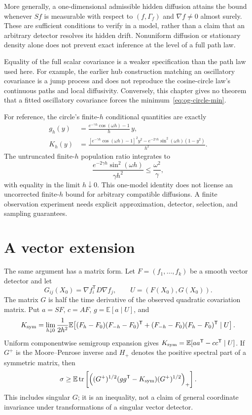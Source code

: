 More generally, a one-dimensional admissible hidden diffusion attains the
bound whenever $Sf$ is measurable with respect to $(f,\Gamma_f)$ and
$\nabla f\ne0$ almost surely. These are sufficient conditions to verify
in a model, rather than a claim that an arbitrary detector resolves its
hidden drift. Nonuniform diffusion or stationary density alone does not
prevent exact inference at the level of a full path law.

Equality of the full scalar covariance is a weaker specification than the
path law used here. For example, the earlier hub construction matching an
oscillatory covariance is a jump process and does not reproduce the
cosine-circle law's continuous paths and local diffusivity. Conversely, this
chapter gives no theorem that a fitted oscillatory covariance forces the
minimum~\eqref{eq:og-circle-min}.

For reference, the circle's finite-$h$ conditional quantities are exactly
\begin{align}
 g_h(y)&=\frac{e^{-\gamma h}\cos(\omega h)-1}{h}\,y,\\
 K_h(y)&=\frac{
 [e^{-\gamma h}\cos(\omega h)-1]^2y^2
 -e^{-2\gamma h}\sin^2(\omega h)(1-y^2)}{h^2}.
 \label{eq:og-circle-finite}
\end{align}
The untruncated finite-$h$ population ratio integrates to
\[
 \frac{e^{-2\gamma h}\sin^2(\omega h)}{\gamma h^2}
 \leq\frac{\omega^2}{\gamma},
\]
with equality in the limit $h\downarrow0$. This one-model identity does not
license an uncorrected finite-$h$ bound for arbitrary compatible diffusions.
A finite observation experiment needs explicit approximation, detector,
selection, and sampling guarantees.

\section{A vector extension}

The same argument has a matrix form. Let $F=(f_1,\ldots,f_k)$ be a smooth
vector detector and let
\[
 G_{ij}(X_0)=\nabla f_i^{\mathsf T}D\nabla f_j,
 \qquad U=(F(X_0),G(X_0)).
\]
The matrix $G$ is half the time derivative of the observed quadratic
covariation matrix. Put $a=SF$, $c=AF$, $g=\mathbb E[a\mid U]$, and
\[
 K_{\rm sym}
 =\lim_{h\downarrow0}\frac{1}{2h^2}\mathbb E\!\left[
 (F_h-F_0)(F_{-h}-F_0)^{\mathsf T}
 +(F_{-h}-F_0)(F_h-F_0)^{\mathsf T}\mid U\right].
\]
Uniform componentwise semigroup expansion gives
$K_{\rm sym}=\mathbb E[aa^{\mathsf T}-cc^{\mathsf T}\mid U]$.
If $G^+$ is the Moore--Penrose inverse and $H_+$ denotes the positive
spectral part of a symmetric matrix, then
\begin{equation}
 \sigma\geq
 \mathbb E\operatorname{tr}\left[
  \left((G^+)^{1/2}(gg^{\mathsf T}-K_{\rm sym})
                    (G^+)^{1/2}\right)_+\right].
 \label{eq:og-vector}
\end{equation}
This includes singular $G$; it is an inequality, not a claim of general
coordinate invariance under transformations of a singular vector detector.

